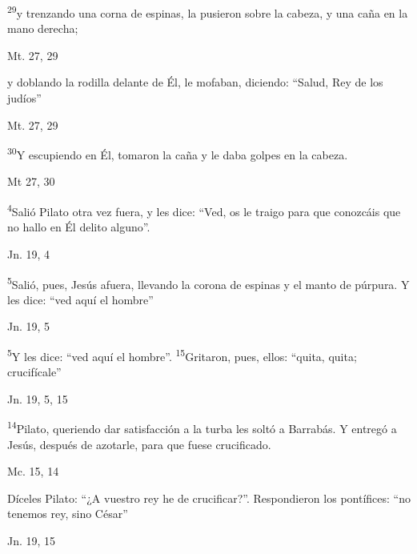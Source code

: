 \documentclass[a4paper,11pt]{article}
\begin{document}
      \textsuperscript{29}y trenzando una corna de espinas, la pusieron sobre la cabeza, y una caña en la mano derecha; 
      \begin{flushright}
        Mt. 27, 29
      \end{flushright}

      y doblando la rodilla delante de Él, le mofaban, diciendo: ``Salud, Rey de los judíos''
      \begin{flushright}
        Mt. 27, 29
      \end{flushright}

      \textsuperscript{30}Y escupiendo en Él, tomaron la caña y le daba golpes en la cabeza.
      \begin{flushright}
        Mt 27, 30
      \end{flushright}

      \textsuperscript{4}Salió Pilato otra vez fuera, y les dice: ``Ved, os le traigo para que conozcáis que no hallo en Él delito alguno''.
      \begin{flushright}
        Jn. 19, 4
      \end{flushright}

      \textsuperscript{5}Salió, pues, Jesús afuera, llevando la corona de espinas y el manto de púrpura. Y les dice: ``ved aquí el hombre''
      \begin{flushright}
        Jn. 19, 5
      \end{flushright}

      \textsuperscript{5}Y les dice: ``ved aquí el hombre''. \textsuperscript{15}Gritaron, pues, ellos: ``quita, quita; crucifícale''
      \begin{flushright}
        Jn. 19, 5, 15
      \end{flushright}

      \textsuperscript{14}Pilato, queriendo dar satisfacción a la turba les soltó a Barrabás. Y entregó a Jesús, después de azotarle, para que fuese crucificado.
      \begin{flushright}
        Mc. 15, 14
      \end{flushright}

      Díceles Pilato: ``¿A vuestro rey he de crucificar?''. Respondieron los pontífices: ``no tenemos rey, sino César''
      \begin{flushright}
        Jn. 19, 15
      \end{flushright}
\end{document}
